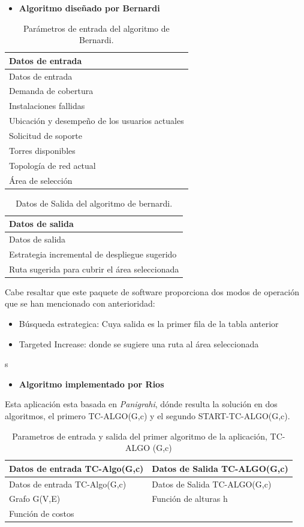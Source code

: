 \documentclass[]{article}
\providecommand{\tightlist}{%
  \setlength{\itemsep}{0pt}\setlength{\parskip}{0pt}}
\begin{document}
\begin{itemize}
\tightlist
\item
  \textbf{Algoritmo diseñado por Bernardi}
\end{itemize}

\begin{longtable}[]{@{}l@{}}
\caption{Parámetros de entrada del algoritmo de
Bernardi.}\tabularnewline
\toprule
Datos de entrada\tabularnewline
\midrule
\endfirsthead
\toprule
Datos de entrada\tabularnewline
\midrule
\endhead
Demanda de cobertura\tabularnewline
Instalaciones fallidas\tabularnewline
Ubicación y desempeño de los usuarios actuales\tabularnewline
Solicitud de soporte\tabularnewline
Torres disponibles\tabularnewline
Topología de red actual\tabularnewline
Área de selección\tabularnewline
\bottomrule
\end{longtable}

\begin{longtable}[]{@{}l@{}}
\caption{Datos de Salida del algoritmo de bernardi.}\tabularnewline
\toprule
Datos de salida\tabularnewline
\midrule
\endfirsthead
\toprule
Datos de salida\tabularnewline
\midrule
\endhead
Estrategia incremental de despliegue sugerido\tabularnewline
Ruta sugerida para cubrir el área seleccionada\tabularnewline
\bottomrule
\end{longtable}

Cabe resaltar que este paquete de software proporciona dos modos de
operación que se han mencionado con anterioridad:

\begin{itemize}
\tightlist
\item
  Búsqueda estrategica: Cuya salida es la primer fila de la tabla
  anterior
\item
  Targeted Increase: donde se sugiere una ruta al área seleccionada
\end{itemize}

s

\begin{itemize}
\tightlist
\item
  \textbf{Algoritmo implementado por Rios}
\end{itemize}

Esta aplicación esta basada en \emph{Panigrahi}, dónde resulta la
solución en dos algoritmos, el primero TC-ALGO(G,c) y el segundo
START-TC-ALGO(G,c).

\begin{longtable}[]{@{}ll@{}}
\caption{Parametros de entrada y salida del primer algoritmo de la
aplicación, TC-ALGO (G,c)}\tabularnewline
\toprule
Datos de entrada TC-Algo(G,c) & Datos de Salida
TC-ALGO(G,c)\tabularnewline
\midrule
\endfirsthead
\toprule
Datos de entrada TC-Algo(G,c) & Datos de Salida
TC-ALGO(G,c)\tabularnewline
\midrule
\endhead
Grafo G(V,E) & Función de alturas h\tabularnewline
Función de costos &\tabularnewline
\bottomrule
\end{longtable}
\end{document}
